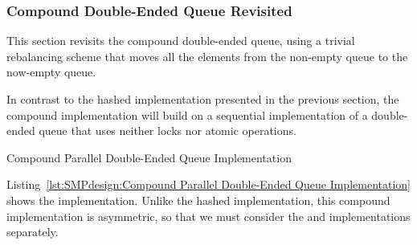 \subsubsection{Compound Double-Ended Queue Revisited}
\label{sec:SMPdesign:Compound Double-Ended Queue Revisited}

This section revisits the compound double-ended queue, using a trivial
rebalancing scheme that moves all the elements from the non-empty
queue to the now-empty queue.

\QuickQuizEnd

In contrast to the hashed implementation presented in
the previous section, the compound implementation will build on
a sequential implementation of a double-ended queue that uses
neither locks nor atomic operations.

\begin{listing}[tbp]
\caption{Compound Parallel Double-Ended Queue Implementation}
\label{lst:SMPdesign:Compound Parallel Double-Ended Queue Implementation}
\end{listing}

Listing~\ref{lst:SMPdesign:Compound Parallel Double-Ended Queue Implementation}
shows the implementation.
Unlike the hashed implementation, this compound implementation is
asymmetric, so that we must consider the 
and  implementations separately.

\QuickQuizEnd

